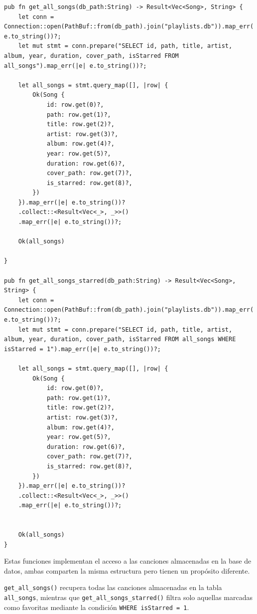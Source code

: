 \documentclass[11pt, a4paper]{article}
\begin{document}
            \begin{lstlisting}[caption={fn get\_all\_songs() y fn get\_all\_songs\_starred()}]
pub fn get_all_songs(db_path:String) -> Result<Vec<Song>, String> {
    let conn = Connection::open(PathBuf::from(db_path).join("playlists.db")).map_err(|e| e.to_string())?;
    let mut stmt = conn.prepare("SELECT id, path, title, artist, album, year, duration, cover_path, isStarred FROM all_songs").map_err(|e| e.to_string())?;

    let all_songs = stmt.query_map([], |row| {
        Ok(Song {
            id: row.get(0)?,
            path: row.get(1)?,
            title: row.get(2)?,
            artist: row.get(3)?,
            album: row.get(4)?,
            year: row.get(5)?,
            duration: row.get(6)?,
            cover_path: row.get(7)?,
            is_starred: row.get(8)?,
        })
    }).map_err(|e| e.to_string())?
    .collect::<Result<Vec<_>, _>>()
    .map_err(|e| e.to_string())?;

    Ok(all_songs)

}

pub fn get_all_songs_starred(db_path:String) -> Result<Vec<Song>, String> {
    let conn = Connection::open(PathBuf::from(db_path).join("playlists.db")).map_err(|e| e.to_string())?;
    let mut stmt = conn.prepare("SELECT id, path, title, artist, album, year, duration, cover_path, isStarred FROM all_songs WHERE isStarred = 1").map_err(|e| e.to_string())?;

    let all_songs = stmt.query_map([], |row| {
        Ok(Song {
            id: row.get(0)?,
            path: row.get(1)?,
            title: row.get(2)?,
            artist: row.get(3)?,
            album: row.get(4)?,
            year: row.get(5)?,
            duration: row.get(6)?,
            cover_path: row.get(7)?,
            is_starred: row.get(8)?,
        })
    }).map_err(|e| e.to_string())?
    .collect::<Result<Vec<_>, _>>()
    .map_err(|e| e.to_string())?;


    Ok(all_songs)
}
            \end{lstlisting}

            Estas funciones implementan el acceso a las canciones almacenadas en la base de datos, ambas comparten la misma estructura pero tienen un propósito diferente.

            \texttt{get\_all\_songs()} recupera todas las canciones almacenadas en la tabla \texttt{all\_songs}, mientras que \texttt{get\_all\_songs\_starred()} filtra solo aquellas marcadas como favoritas mediante la condición \texttt{WHERE isStarred = 1}.
\end{document}
